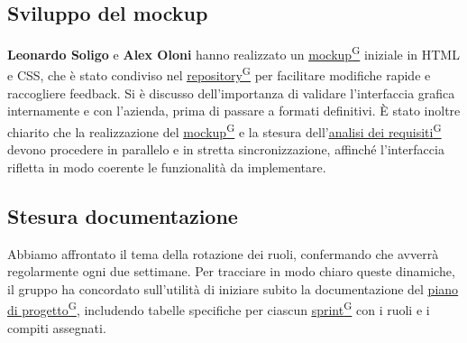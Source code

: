 \documentclass[a4paper,12pt]{article}
\providecommand{\glslink}[2]{\href{https://alittlebyte-19.github.io/Documentazione/glossario.html\#gls-#1}{\underline{#2}\textsuperscript{\scriptsize G}}}
\begin{document}
\subsection{Sviluppo del mockup}
\textbf{Leonardo Soligo} e \textbf{Alex Oloni} hanno realizzato un \glslink{mockup}{mockup} iniziale in HTML e CSS, che è stato condiviso nel \glslink{repository}{repository} per facilitare modifiche rapide e raccogliere feedback. 
Si è discusso dell'importanza di validare l'interfaccia grafica internamente e con l'azienda, prima di passare a formati definitivi. 
È stato inoltre chiarito che la realizzazione del \glslink{mockup}{mockup} e la stesura dell'\glslink{analisi-dei-requisiti-adr}{analisi dei requisiti} devono procedere in parallelo e in stretta sincronizzazione, affinché l'interfaccia rifletta in modo coerente le funzionalità da implementare. 

\subsection{Stesura documentazione}
Abbiamo affrontato il tema della rotazione dei ruoli, confermando che avverrà regolarmente ogni due settimane. 
Per tracciare in modo chiaro queste dinamiche, il gruppo ha concordato sull'utilità di iniziare subito la documentazione del \glslink{piano-di-progetto}{piano di progetto}, includendo tabelle specifiche per ciascun \glslink{sprint}{sprint} con i ruoli e i compiti assegnati.
\end{document}
